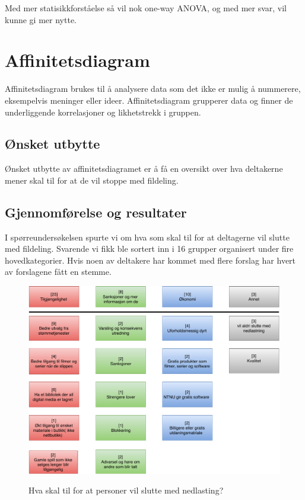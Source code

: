 Med mer statisikkforståelse så vil nok one-way ANOVA, og med mer svar, vil kunne gi mer nytte.  


\section{Affinitetsdiagram}
Affinitetsdiagram brukes til å analysere data som det ikke er mulig å nummerere, eksempelvis meninger eller ideer. Affinitetsdiagram grupperer data og finner de underliggende korrelasjoner og likhetstrekk i gruppen. 

\subsection{Ønsket utbytte}
Ønsket utbytte av affinitetsdiagramet er å få en oversikt over hva deltakerne mener skal til for at de vil stoppe med fildeling.
\subsection{Gjennomførelse og resultater}
I spørreundersøkelsen spurte vi om hva som skal til for at deltagerne vil slutte med fildeling. Svarende vi fikk ble sortert inn i 16 grupper organisert under fire hovedkategorier. Hvis noen av deltakere har kommet med flere forslag har hvert av forslagene fått en stemme.  

\begin{figure}[H]
    \centering
    \includegraphics[scale=0.50]{case_1/bilder/stoppe_nedlastning.pdf}
    \label{fig:stoppe_nedlastning}
    \caption{Hva skal til for at personer vil slutte med nedlasting?}
\end{figure}

